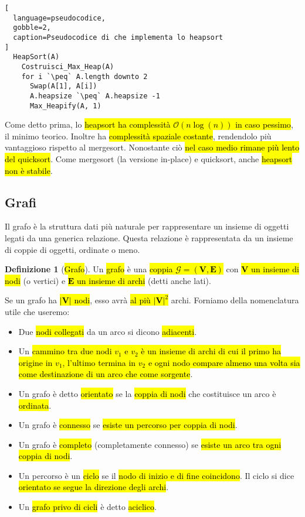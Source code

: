 \documentclass[a4paper,11pt,oneside]{article}
\theoremstyle{plain}
\theoremstyle{definition}
\newtheorem{defn}{Definizione}[section]
\theoremstyle{remark}
\newcommand{\peq}{$\gets$}
\begin{document}
\begin{lstlisting}[
  language=pseudocodice,
  gobble=2,
  caption=Pseudocodice di che implementa lo heapsort
]
  HeapSort(A)
    Costruisci_Max_Heap(A)
    for i `\peq` A.length downto 2
      Swap(A[1], A[i])
      A.heapsize `\peq` A.heapsize -1
      Max_Heapify(A, 1)
\end{lstlisting}

\noindent Come detto prima, lo \hl{heapsort ha complessità
$\mathcal{O}(n\log(n))$ in caso pessimo}, il minimo teorico. Inoltre ha
\hl{complessità spaziale costante}, rendendolo più vantaggioso rispetto al
mergesort. Nonostante ciò \hl{nel caso medio rimane più lento del quicksort}.
Come mergesort (la versione in-place) e quicksort, anche \hl{heapsort non è
stabile}.

\subsection{Grafi}\label{sec:graphs}

Il grafo è la struttura dati più naturale per rappresentare un insieme di
oggetti legati da una generica relazione. Questa relazione è rappresentata da un
insieme di coppie di oggetti, ordinate o meno.

\begin{defn}[\hl{Grafo}]\label{def:graph}
  Un \hl{grafo} è una \hl{coppia $\mathcal{G} = (\mathbf{V}, \mathbf{E})$} con
  \hl{$\mathbf{V}$ un insieme di nodi} (o vertici) e \hl{$\mathbf{E}$ un insieme
  di archi} (detti anche lati).
\end{defn}

Se un grafo ha \hl{$|\mathbf{V}|$ nodi}, esso avrà \hl{al più
${|\mathbf{V}|}^2$} archi. Forniamo della nomenclatura utile che useremo:

\begin{itemize}
  \item Due \hl{nodi collegati} da un arco si dicono \hl{adiacenti}.
  \item Un \hl{cammino tra due nodi $v_1$ e $v_2$ è un insieme di archi di cui
    il primo ha origine in $v_1$, l'ultimo termina in $v_2$ e ogni nodo compare
    almeno una volta sia come destinazione di un arco che come sorgente}.
  \item Un grafo è detto \hl{orientato} se la \hl{coppia di nodi} che
    costituisce un arco è \hl{ordinata}.
  \item Un grafo è \hl{connesso} se \hl{esiste un percorso per coppia di nodi}.
  \item Un grafo è \hl{completo} (completamente connesso) se \hl{esiste un arco
    tra ogni coppia di nodi}.
  \item Un percorso è un \hl{ciclo} se il \hl{nodo di inizio e di fine
    coincidono}. Il ciclo si dice \hl{orientato se segue la direzione degli
    archi}.
  \item Un \hl{grafo privo di cicli} è detto \hl{aciclico}.
\end{itemize}
\end{document}
